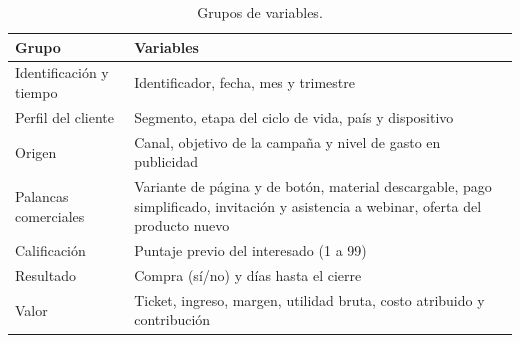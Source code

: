 \documentclass[11pt,letterpaper]{article}
\newcommand{\encabezado}{\rowcolor{mcicCian!15}}
\begin{document}
\begin{table}[H]
\centering\small
\caption{Grupos de variables.}
\begin{tabularx}{\linewidth}{l L}
\toprule
\encabezado Grupo & Variables \\
\midrule
Identificación y tiempo & Identificador, fecha, mes y trimestre \\
Perfil del cliente & Segmento, etapa del ciclo de vida, país y dispositivo \\
Origen & Canal, objetivo de la campaña y nivel de gasto en publicidad \\
Palancas comerciales & Variante de página y de botón, material descargable, pago simplificado, invitación y
asistencia a webinar, oferta del producto nuevo \\
Calificación & Puntaje previo del interesado (1 a 99) \\
Resultado & Compra (sí/no) y días hasta el cierre \\
Valor & Ticket, ingreso, margen, utilidad bruta, costo atribuido y contribución \\
\bottomrule
\end{tabularx}
\end{table}
\end{document}
